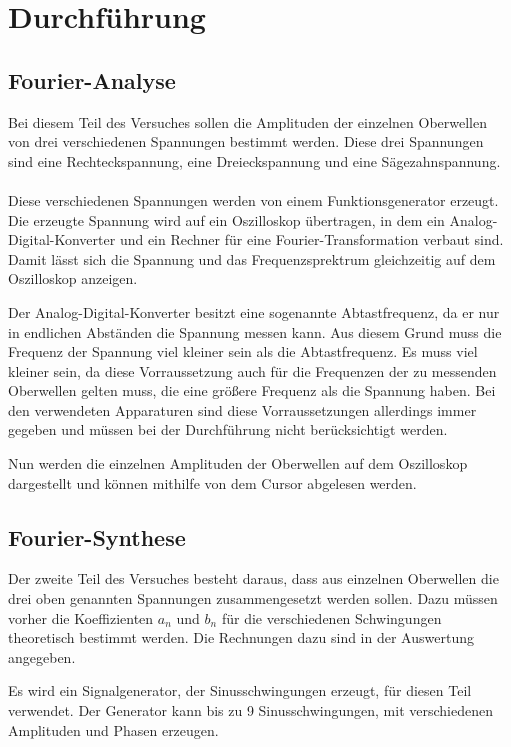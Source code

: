 \section{Durchführung}
\subsection{Fourier-Analyse}

Bei diesem Teil des Versuches sollen die Amplituden der einzelnen Oberwellen von
drei verschiedenen Spannungen bestimmt werden. Diese drei Spannungen sind eine
Rechteckspannung, eine Dreieckspannung und eine Sägezahnspannung. \\\\

Diese verschiedenen Spannungen werden von einem Funktionsgenerator erzeugt. Die
erzeugte Spannung wird auf ein Oszilloskop übertragen, in dem ein Analog-Digital-Konverter
und ein Rechner für eine Fourier-Transformation verbaut sind. Damit lässt sich die Spannung
und das Frequenzsprektrum gleichzeitig auf dem Oszilloskop anzeigen.

Der Analog-Digital-Konverter besitzt eine sogenannte Abtastfrequenz, da er nur in
endlichen Abständen die Spannung messen kann. Aus diesem Grund muss die Frequenz
der Spannung viel kleiner sein als die Abtastfrequenz. Es muss viel kleiner sein, da
diese Vorraussetzung auch für die Frequenzen der zu messenden Oberwellen gelten muss,
die eine größere Frequenz als die Spannung haben.
Bei den verwendeten Apparaturen sind diese Vorraussetzungen allerdings immer gegeben
und müssen bei der Durchführung nicht berücksichtigt werden.

Nun werden die einzelnen Amplituden der Oberwellen auf dem Oszilloskop dargestellt
und können mithilfe von dem Cursor abgelesen werden.

\subsection{Fourier-Synthese}

Der zweite Teil des Versuches besteht daraus, dass aus einzelnen Oberwellen die
drei oben genannten Spannungen zusammengesetzt werden sollen. Dazu müssen vorher
die Koeffizienten $a_n$ und $b_n$ für die verschiedenen Schwingungen theoretisch
bestimmt werden. Die Rechnungen dazu sind in der Auswertung angegeben.

Es wird ein Signalgenerator, der Sinusschwingungen erzeugt, für diesen Teil verwendet.
Der Generator kann bis zu 9 Sinusschwingungen, mit verschiedenen Amplituden und Phasen
erzeugen.

